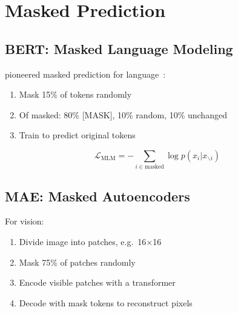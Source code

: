 \section{Masked Prediction}


\subsection{BERT: Masked Language Modeling}

 pioneered masked prediction for language~\cite{Devlin2019BERT}:
\begin{enumerate}
    \item Mask 15\% of tokens randomly
    \item Of masked: 80\% [MASK], 10\% random, 10\% unchanged
    \item Train to predict original tokens
\end{enumerate}

\begin{equation}
    \mathcal{L}_{\text{MLM}} = -\sum_{i \in \text{masked}} \log p(x_i | x_{\backslash i})
\end{equation}

\subsection{MAE: Masked Autoencoders}


For vision:
\begin{enumerate}
    \item Divide image into patches, e.g.\ 16$\times$16
    \item Mask 75\% of patches randomly
    \item Encode visible patches with a transformer
    \item Decode with mask tokens to reconstruct pixels
\end{enumerate}

